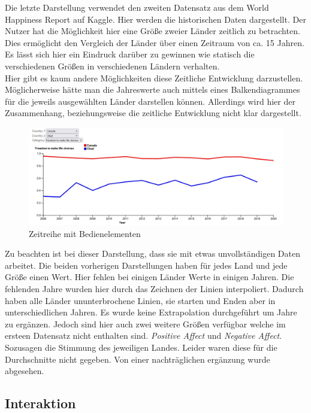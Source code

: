 Die letzte Darstellung verwendet den zweiten Datensatz aus dem World Happiness Report auf Kaggle. Hier werden die historischen Daten dargestellt. Der Nutzer hat die Möglichkeit hier eine Größe zweier Länder zeitlich zu betrachten. Dies ermöglicht den Vergleich der Länder über einen Zeitraum von ca. 15 Jahren. Es lässt sich hier ein Eindruck darüber zu gewinnen wie statisch die verschiedenen Größen in verschiedenen Ländern verhalten. \\

Hier gibt es kaum andere Möglichkeiten diese Zeitliche Entwicklung darzustellen. Möglicherweise hätte man die Jahreswerte auch mittels eines Balkendiagrammes für die jeweils ausgewählten Länder darstellen können. Allerdings wird hier der Zusammenhang, beziehungsweise die zeitliche Entwicklung nicht klar dargestellt. 

\begin{figure}[h]
 \centering
 \includegraphics[width = \textwidth]{img/timeseries.jpg}
 \caption{Zeitreihe mit Bedienelementen}
 \label{fig:timeseries}
\end{figure}

Zu beachten ist bei dieser Darstellung, dass sie mit etwas unvollständigen Daten arbeitet. Die beiden vorherigen Darstellungen haben für jedes Land und jede Größe einen Wert. Hier fehlen bei einigen Länder Werte in einigen Jahren. Die fehlenden Jahre wurden hier durch das Zeichnen der Linien interpoliert. Dadurch haben alle Länder ununterbrochene Linien, sie starten und Enden aber in unterschiedlichen Jahren. Es wurde keine Extrapolation durchgeführt um Jahre zu ergänzen. Jedoch sind hier auch zwei weitere Größen verfügbar welche im ersteen Datensatz nicht enthalten sind. \textit{Positive Affect} und \textit{Negative Affect}. Sozusagen die Stimmung des jeweiligen Landes. Leider waren diese für die Durchschnitte nicht gegeben. Von einer nachträglichen ergänzung wurde abgesehen. 

\subsection{Interaktion}

